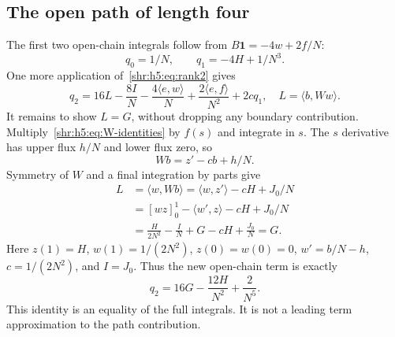 \documentclass[11pt,letterpaper]{article}
\numberwithin{equation}{section}
\theoremstyle{definition}
\newcommand{\1}{\mathbf 1}
\newcommand{\one}{\mathbf1}
\newcommand{\ip}[2]{\langle #1,#2\rangle}
\begin{document}
\subsection{The open path of length four}
The first two open-chain integrals follow from
$B\one=-4w+2f/N$:
\begin{equation}
 q_0=1/N,\qquad q_1=-4H+1/N^3.
 \label{shr:h5:eq:q01}
\end{equation}
One more application of~\eqref{shr:h5:eq:rank2} gives
\begin{equation}
 q_2=16L-\frac{8I}{N}-\frac{4\ip e w}{N}
            +\frac{2\ip e f}{N^2}+2cq_1,
 \quad L=\ip b{Ww}.
 \label{shr:h5:eq:q2-expand}
\end{equation}
It remains to show $L=G$, without dropping any boundary contribution.
Multiply~\eqref{shr:h5:eq:W-identities} by $f(s)$ and integrate in $s$.
The $s$ derivative has upper flux $h/N$ and lower flux zero, so
\begin{equation}
 Wb=z'-cb+h/N.
 \label{shr:h5:eq:Wb}
\end{equation}
Symmetry of $W$ and a final integration by parts give
\begin{align}
 L&=\ip w{Wb}=\ip w{z'}-cH+J_0/N\\
  &=[wz]_0^1-\ip{w'}z-cH+J_0/N\\
  &=\frac{H}{2N^2}-\frac IN+G-cH+\frac{J_0}{N}=G.
 \label{shr:h5:eq:L-equals-G}
\end{align}
Here $z(1)=H$, $w(1)=1/(2N^2)$, $z(0)=w(0)=0$,
$w'=b/N-h$, $c=1/(2N^2)$, and $I=J_0$.
Thus the new open-chain term is exactly
\begin{equation}
 q_2=16G-\frac{12H}{N^2}+\frac2{N^5}.
 \label{shr:h5:eq:q2}
\end{equation}
This identity is an equality of the full integrals. It is not a leading
term approximation to the path contribution.
\end{document}
